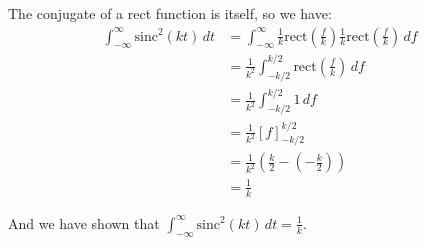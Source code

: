 \documentclass{article}
\begin{document}
\begin{enumerate}[label=1.\arabic*]
    The conjugate of a rect function is itself, so we have:
    \begin{align*}
        \int_{-\infty}^{\infty} \text{sinc}^2(kt) \, dt &= \int_{-\infty}^{\infty} \frac{1}{k}\text{rect}\left(\frac{f}{k}\right)\frac{1}{k}\text{rect}\left(\frac{f}{k}\right) \, df \\
        &= \frac{1}{k^2}\int_{-k/2}^{k/2} \text{rect}\left(\frac{f}{k}\right) \, df \\
        &= \frac{1}{k^2}\int_{-k/2}^{k/2} 1 \, df \\
        &= \frac{1}{k^2}\left[ f \right]_{-k/2}^{k/2} \\
        &= \frac{1}{k^2}\left( \frac{k}{2} - \left( -\frac{k}{2} \right) \right) \\
        &= \frac{1}{k}
    \end{align*}

    And we have shown that $\int_{-\infty}^{\infty} \text{sinc}^2(kt) \, dt = \frac{1}{k}$.
\end{enumerate}
\end{document}
